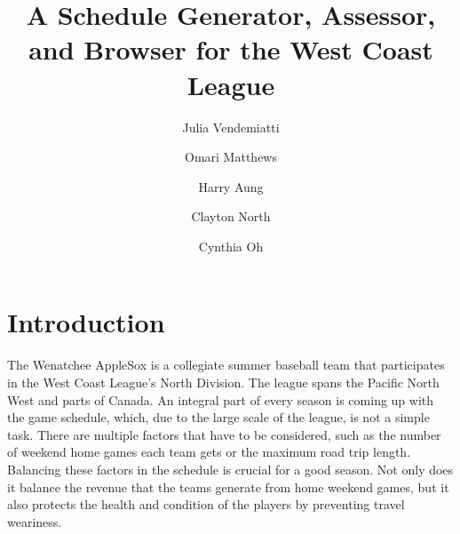 \documentclass[book]{hmcclinic}
\title{A Schedule Generator, Assessor, and Browser for the West Coast League}
\author{Julia Vendemiatti \and Omari Matthews \and Harry Aung \and Clayton North \and Cynthia Oh}
\begin{document}

\maketitle


\tableofcontents
\newpage


\chapter{Introduction}

The Wenatchee AppleSox is a collegiate summer baseball team that participates in the West Coast League’s North Division. The league spans the Pacific North West and parts of Canada. An integral part of every season is coming up with the game schedule, which, due to the large scale of the league, is not a simple task. There are multiple factors that have to be considered, such as the number of weekend home games each team gets or the maximum road trip length. Balancing these factors in the schedule is crucial for a good season. Not only does it balance the revenue that the teams generate from home weekend games, but it also protects the health and condition of the players by preventing travel weariness. 
\end{document}
